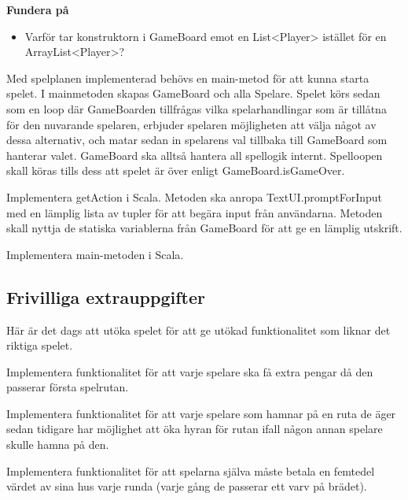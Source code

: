 \textbf{Fundera på}
\begin{itemize}
\item Varför tar konstruktorn i GameBoard emot en List<Player> istället för en ArrayList<Player>?
\end{itemize}

\Task Med spelplanen implementerad behövs en main-metod för att kunna starta spelet. I mainmetoden skapas GameBoard och alla Spelare. Spelet körs sedan som en loop där GameBoarden tillfrågas vilka spelarhandlingar som är tillåtna för den nuvarande spelaren, erbjuder spelaren möjligheten att välja något av dessa alternativ, och matar sedan in spelarens val tillbaka till GameBoard som hanterar valet. GameBoard ska alltså hantera all spellogik internt.  Spelloopen skall köras tills dess att spelet är över enligt GameBoard.isGameOver.

\Subtask Implementera getAction i Scala. Metoden ska anropa TextUI.promptForInput med en lämplig lista av tupler för att begära input från användarna. Metoden skall nyttja de statiska variablerna från GameBoard för att ge en lämplig utskrift.

\Subtask Implementera main-metoden i Scala.




\subsection{Frivilliga extrauppgifter}

\Task Här är det dags att utöka spelet för att ge utökad funktionalitet som liknar det riktiga spelet.

\Subtask Implementera funktionalitet för att varje spelare ska få extra pengar då den passerar första spelrutan.

\Subtask Implementera funktionalitet för att varje spelare som hamnar på en ruta de äger sedan tidigare har möjlighet att öka hyran för rutan ifall någon annan spelare skulle hamna på den.

\Subtask Implementera funktionalitet för att spelarna själva måste betala en femtedel värdet av sina hus varje runda (varje gång de passerar ett varv på brädet).
    

